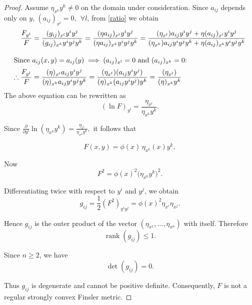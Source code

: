 \documentclass[12pt]{article}
\theoremstyle{definition}
\begin{document}
												\begin{proof}
Assume $\eta_{x^k}y^k\neq 0$ on the domain under consideration.	Since $a_{ij}$ depends only on $y$, $(a_{ij})_{x^l}=0, ~~ \forall l$, from \eqref{ratio} we obtain 
\begin{align*}
	\frac{F_{y^l}}{F} &= \frac{(g_{ij})_{x^l} y^i y^j}{(g_{ij})_{x^k} y^i y^j y^k} = \frac{(\eta a_{ij})_{x^l} y^i y^j}{(\eta a_{ij})_{x^k} y^i y^j y^k} = \frac{(\eta_{x^l}) a_{ij} y^i y^j + \eta (a_{ij})_{x^l} y^i y^j}{(\eta_{x^k}) a_{ij} y^i y^j y^k + \eta (a_{ij})_{x^k} y^i y^j y^k} \\[2ex]
	\intertext{Since $a_{ij}(x,y) = a_{ij}(y) \implies (a_{ij})_{x^l} = 0$ and $(a_{ij})_{x^k} = 0$:}
	\therefore \frac{F_{y^l}}{F} &= \frac{(\eta)_{x^l} a_{ij} y^i y^j}{(\eta)_{x^k} a_{ij} y^i y^j y^k} = \frac{(\eta_{x^l}) (a_{ij} y^i y^j)}{(\eta)_{x^k} (a_{ij} y^i y^j) y^k}= \frac{(\eta_{x^l})}{(\eta)_{x^k} y^k}
\end{align*}
													The above equation can be rewritten as
													\begin{equation}
													(\ln F)_{y^l}
													=
													\frac{\eta_{x^l}}
													{\eta_{x^k}y^k}.
													\end{equation}
													
													Since $\frac{\partial}{\partial y^l}
													\ln(\eta_{x^k}y^k)= \frac{\eta_{x^l}}
													{\eta_{x^k}y^k},$ it follows that
													
													\begin{equation}
													F(x,y)
													=
													\phi(x)\,\eta_{x^k}(x)y^k,
													\end{equation}
													
													Now
													\begin{equation}
													F^2
													=
													\phi(x)^2\bigl(\eta_{x^k}y^k\bigr)^2.
													\end{equation}
													
													Differentiating twice with respect to $y^i$ and $y^j$, we obtain
													\begin{equation}
													g_{ij}
													=
													\frac12(F^2)_{y^iy^j}
													=
													\phi(x)^2\eta_{x^i}\eta_{x^j}.
													\end{equation}
													
													Hence $g_{ij}$ is the outer product of the vector
													$(\eta_{x^1},\ldots,\eta_{x^n})$ with itself. Therefore
													\begin{equation}
													\operatorname{rank}(g_{ij})
													\le 1.
													\end{equation}
													
													Since $n\ge 2$, we have
													\begin{equation}
													\det(g_{ij})=0.
													\end{equation}
													
													Thus $g_{ij}$ is degenerate and cannot be positive definite.
													Consequently, $F$ is not a regular strongly convex Finsler metric.
												\end{proof}
\end{document}
